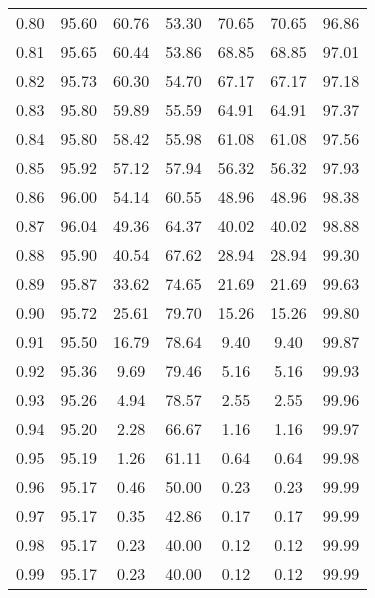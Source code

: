 \begin{tabular}{|c|c|c|c|c|c|c|}
      0.80 &     95.60 &     60.76 &      53.30 &   70.65 &      70.65 &         96.86 \\
      0.81 &     95.65 &     60.44 &      53.86 &   68.85 &      68.85 &         97.01 \\
      0.82 &     95.73 &     60.30 &      54.70 &   67.17 &      67.17 &         97.18 \\
      0.83 &     95.80 &     59.89 &      55.59 &   64.91 &      64.91 &         97.37 \\
      0.84 &     95.80 &     58.42 &      55.98 &   61.08 &      61.08 &         97.56 \\
      0.85 &     95.92 &     57.12 &      57.94 &   56.32 &      56.32 &         97.93 \\
      0.86 &     96.00 &     54.14 &      60.55 &   48.96 &      48.96 &         98.38 \\
      0.87 &     96.04 &     49.36 &      64.37 &   40.02 &      40.02 &         98.88 \\
      0.88 &     95.90 &     40.54 &      67.62 &   28.94 &      28.94 &         99.30 \\
      0.89 &     95.87 &     33.62 &      74.65 &   21.69 &      21.69 &         99.63 \\
      0.90 &     95.72 &     25.61 &      79.70 &   15.26 &      15.26 &         99.80 \\
      0.91 &     95.50 &     16.79 &      78.64 &    9.40 &       9.40 &         99.87 \\
      0.92 &     95.36 &      9.69 &      79.46 &    5.16 &       5.16 &         99.93 \\
      0.93 &     95.26 &      4.94 &      78.57 &    2.55 &       2.55 &         99.96 \\
      0.94 &     95.20 &      2.28 &      66.67 &    1.16 &       1.16 &         99.97 \\
      0.95 &     95.19 &      1.26 &      61.11 &    0.64 &       0.64 &         99.98 \\
      0.96 &     95.17 &      0.46 &      50.00 &    0.23 &       0.23 &         99.99 \\
      0.97 &     95.17 &      0.35 &      42.86 &    0.17 &       0.17 &         99.99 \\
      0.98 &     95.17 &      0.23 &      40.00 &    0.12 &       0.12 &         99.99 \\
      0.99 &     95.17 &      0.23 &      40.00 &    0.12 &       0.12 &         99.99 \\
\bottomrule
\end{tabular}
